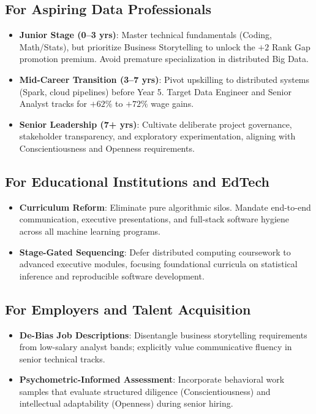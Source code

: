 \documentclass[conference]{IEEEtran}
\begin{document}
\subsection{For Aspiring Data Professionals}
\begin{itemize}
    \item \textbf{Junior Stage (0--3 yrs)}: Master technical fundamentals (Coding, Math/Stats), but prioritize Business Storytelling to unlock the $+2$ Rank Gap promotion premium. Avoid premature specialization in distributed Big Data.
    \item \textbf{Mid-Career Transition (3--7 yrs)}: Pivot upskilling to distributed systems (Spark, cloud pipelines) before Year 5. Target Data Engineer and Senior Analyst tracks for $+62\%$ to $+72\%$ wage gains.
    \item \textbf{Senior Leadership (7+ yrs)}: Cultivate deliberate project governance, stakeholder transparency, and exploratory experimentation, aligning with Conscientiousness and Openness requirements.
\end{itemize}

\subsection{For Educational Institutions and EdTech}
\begin{itemize}
    \item \textbf{Curriculum Reform}: Eliminate pure algorithmic silos. Mandate end-to-end communication, executive presentations, and full-stack software hygiene across all machine learning programs.
    \item \textbf{Stage-Gated Sequencing}: Defer distributed computing coursework to advanced executive modules, focusing foundational curricula on statistical inference and reproducible software development.
\end{itemize}

\subsection{For Employers and Talent Acquisition}
\begin{itemize}
    \item \textbf{De-Bias Job Descriptions}: Disentangle business storytelling requirements from low-salary analyst bands; explicitly value communicative fluency in senior technical tracks.
    \item \textbf{Psychometric-Informed Assessment}: Incorporate behavioral work samples that evaluate structured diligence (Conscientiousness) and intellectual adaptability (Openness) during senior hiring.
\end{itemize}
\end{document}
